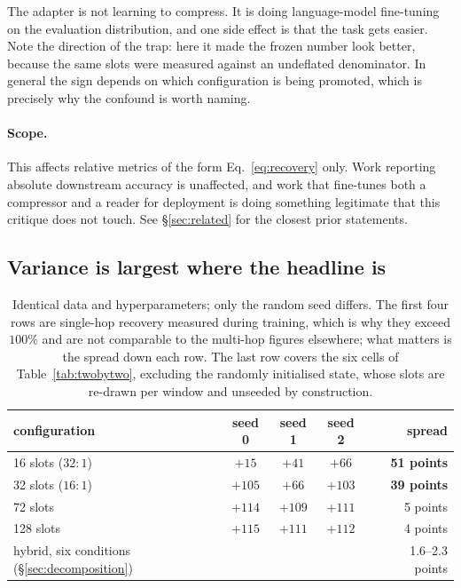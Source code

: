\documentclass[11pt]{article}
\begin{document}
The adapter is not learning to compress. It is doing language-model fine-tuning
on the evaluation distribution, and one side effect is that the task gets
easier. Note the direction of the trap: here it made the frozen number look
better, because the same slots were measured against an undeflated denominator.
In general the sign depends on which configuration is being promoted, which is
precisely why the confound is worth naming.

\paragraph{Scope.} This affects relative metrics of the form
Eq.~\ref{eq:recovery} only. Work reporting absolute downstream accuracy is
unaffected, and work that fine-tunes both a compressor and a reader for
deployment is doing something legitimate that this critique does not touch. See
\S\ref{sec:related} for the closest prior statements.

\subsection{Variance is largest where the headline is}

\begin{table}[ht]
\centering
\begin{tabular}{lccccr}
\toprule
configuration & seed 0 & seed 1 & seed 2 & & spread \\
\midrule
16 slots ($32{:}1$) & $+15$ & $+41$ & $+66$ & & \textbf{51 points} \\
32 slots ($16{:}1$) & $+105$ & $+66$ & $+103$ & & \textbf{39 points} \\
72 slots & $+114$ & $+109$ & $+111$ & & 5 points \\
128 slots & $+115$ & $+111$ & $+112$ & & 4 points \\
\midrule
hybrid, six conditions (\S\ref{sec:decomposition}) & & & & & 1.6--2.3 points \\
\bottomrule
\end{tabular}
\caption{Identical data and hyperparameters; only the random seed differs. The
first four rows are single-hop recovery measured during training, which is why
they exceed $100\%$ and are not comparable to the multi-hop figures elsewhere;
what matters is the spread down each row. The last row covers the six cells of
Table~\ref{tab:twobytwo}, excluding the randomly initialised state, whose slots
are re-drawn per window and unseeded by construction.}
\label{tab:variance}
\end{table}
\end{document}
